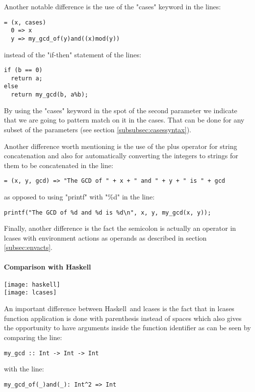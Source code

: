 \documentclass[diploma]{softlab-thesis}
\def\H{Haskell}
\begin{document}
Another notable difference is the use of the "cases" keyword in the lines:
\begin{verbatim}
= (x, cases)
  0 => x
  y => my_gcd_of(y)and((x)mod(y))
\end{verbatim}
instead of the "if-then" statement of the lines:
\begin{verbatim}
if (b == 0)
  return a;
else
  return my_gcd(b, a%b);
\end{verbatim}
By using the "cases" keyword in the spot of the second parameter we indicate
that we are going to pattern match on it in the cases. That can be done
for any subset of the parameters (see section \ref{subsubsec:casessyntax}).

Another difference worth mentioning is the use of the plus operator for
string concatenation and also for automatically converting the integers to
strings for them to be concatenated in the line:
\begin{verbatim}
= (x, y, gcd) => "The GCD of " + x + " and " + y + " is " + gcd
\end{verbatim}
as opposed to using "printf" with "\%d" in the line:
\begin{verbatim}
printf("The GCD of %d and %d is %d\n", x, y, my_gcd(x, y));
\end{verbatim}

Finally, another difference is the fact the semicolon is actually an operator
in lcases with environment actions as operands as described in section
\ref{subsec:envacts}.

\newpage
\paragraph{Comparison with \H}
\begin{center}
\texttt{[image: haskell]}\\
\vspace{0.2cm}
\texttt{[image: lcases]}
\end{center}

An important difference between \H\ and lcases is the fact that in lcases
function application is done with parenthesis instead of spaces which also
gives the opportunity to have arguments inside the function identifier as can
be seen by comparing the line:
\begin{verbatim}
my_gcd :: Int -> Int -> Int
\end{verbatim}
with the line:
\begin{verbatim}
my_gcd_of(_)and(_): Int^2 => Int
\end{verbatim}
\end{document}
